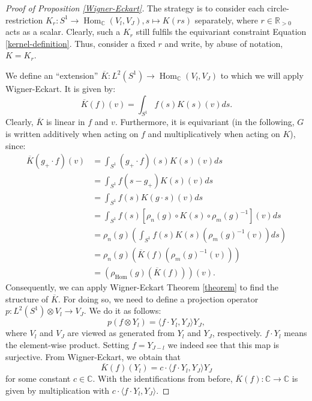 \documentclass[12pt, a4paper]{article}
\theoremstyle{plain}
\theoremstyle{definition}
\theoremstyle{remark}
\newcommand{\C}{\mathds{C}}
\DeclareMathOperator{\Hom}{Hom}
\begin{document}
\begin{proof}[Proof of Proposition \ref{Wigner-Eckart}]
The strategy is to consider each circle-restriction $K_r: S^1 \to \Hom_{\C}(V_l, V_J), s \mapsto K(rs)$ separately, where $r \in \mathbb{R}_{>0}$ acts as a scalar. Clearly, such a $K_r$ still fulfils the equivariant constraint Equation \ref{kernel-definition}. Thus, consider a fixed $r$ and write, by abuse of notation, $K = K_r$.

We define an ``extension'' $\overline{K}: L^2\left(S^1\right) \to \Hom_{\C}(V_l, V_{J})$ to which we will apply Wigner-Eckart. It is given by:
\begin{equation*}
\overline{K}(f)(v) = \int_{S^1}f(s)K(s)(v)ds.
\end{equation*}
Clearly, $\overline{K}$ is linear in $f$ and $v$. Furthermore, it is equivariant
(in the following, $G$ is written additively when acting on $f$ and multiplicatively when acting on $K$), since:
\begin{align*}
\overline{K}(g_+ \cdot f)(v) & = \int_{S^1} (g_+\cdot f)(s) K(s)(v) ds \\
& = \int_{S^1} f(s - g_{+}) K(s)(v)ds \\
& = \int_{S^1} f(s) K(g\cdot s)(v)ds \\
& = \int_{S^1} f(s) \left[ \rho_{n}(g) \circ K(s) \circ \rho_m(g)^{-1}\right](v) ds  \\
& = \rho_n(g) \left( \int_{S^1} f(s) K(s) \left( \rho_m(g)^{-1}(v)\right)ds \right) \\
& = \rho_n(g) \left( \overline{K}(f)\left(\rho_m(g)^{-1}(v) \right)\right) \\
& = \left(\rho_{\text{Hom}}(g)\left( \overline{K}(f) \right)\right)(v).
\end{align*}
Consequently, we can apply Wigner-Eckart Theorem \ref{theorem} to find the structure of $\overline{K}$. For doing so, we need to define a projection operator $p: L^2\left(S^1\right) \otimes V_l \to V_J$. We do it as follows:
\begin{equation*}
p(f \otimes Y_l) = \langle f \cdot Y_l, Y_{J}\rangle Y_{J},
\end{equation*}
where $V_l$ and $V_J$ are viewed as generated from $Y_l$ and $Y_{J}$, respectively. $f \cdot Y_l$ means the element-wise product. Setting $f = Y_{J-l}$ we indeed see that this map is surjective. From Wigner-Eckart, we obtain that
\begin{equation*}
\overline{K}(f)(Y_l) = c \cdot \langle f \cdot Y_l, Y_{J} \rangle Y_{J}
\end{equation*}
for some constant $c \in \C$. With the identifications from before, $\overline{K}(f): \C \to \C$ is given by multiplication with $c \cdot \langle f \cdot Y_l, Y_{J} \rangle$.


\end{proof}
\end{document}
